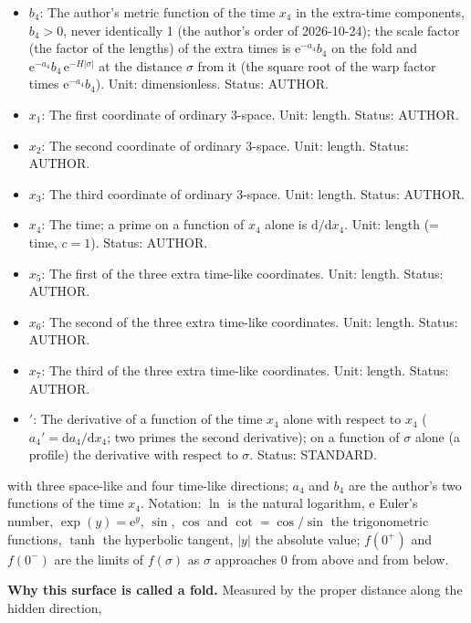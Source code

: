 \documentclass[
  10pt,
]{article}
\begin{document}
\begin{itemize}
  Status: AUTHOR.
\item
  \(b_4\): The author's metric function of the time \(x_4\) in the
  extra-time components, \(b_4 > 0\), never identically 1 (the author's
  order of 2026-10-24); the scale factor (the factor of the lengths) of
  the extra times is \(\mathrm{e}^{-a_4}b_4\) on the fold and
  \(\mathrm{e}^{-a_4}b_4\,\mathrm{e}^{-H\lvert\sigma\rvert}\) at the
  distance \(\sigma\) from it (the square root of the warp factor times
  \(\mathrm{e}^{-a_4}b_4\)). Unit: dimensionless. Status: AUTHOR.
\item
  \(x_1\): The first coordinate of ordinary 3-space. Unit: length.
  Status: AUTHOR.
\item
  \(x_2\): The second coordinate of ordinary 3-space. Unit: length.
  Status: AUTHOR.
\item
  \(x_3\): The third coordinate of ordinary 3-space. Unit: length.
  Status: AUTHOR.
\item
  \(x_4\): The time; a prime on a function of \(x_4\) alone is
  \(\mathrm{d}/\mathrm{d}x_4\). Unit: length (= time, \(c = 1\)).
  Status: AUTHOR.
\item
  \(x_5\): The first of the three extra time-like coordinates. Unit:
  length. Status: AUTHOR.
\item
  \(x_6\): The second of the three extra time-like coordinates. Unit:
  length. Status: AUTHOR.
\item
  \(x_7\): The third of the three extra time-like coordinates. Unit:
  length. Status: AUTHOR.
\item
  \({}'\): The derivative of a function of the time \(x_4\) alone with
  respect to \(x_4\) (\(a_4' = \mathrm{d}a_4/\mathrm{d}x_4\); two primes
  the second derivative); on a function of \(\sigma\) alone (a profile)
  the derivative with respect to \(\sigma\). Status: STANDARD.
\end{itemize}

with three space-like and four time-like directions; \(a_4\) and \(b_4\)
are the author's two functions of the time \(x_4\). Notation: \(\ln\) is
the natural logarithm, \(\mathrm{e}\) Euler's number,
\(\exp(y) = \mathrm{e}^y\), \(\sin\), \(\cos\) and \(\cot = \cos/\sin\)
the trigonometric functions, \(\tanh\) the hyperbolic tangent,
\(\lvert y\rvert\) the absolute value; \(f(0^+)\) and \(f(0^-)\) are the
limits of \(f(\sigma)\) as \(\sigma\) approaches 0 from above and from
below.

\textbf{Why this surface is called a fold.} Measured by the proper
distance along the hidden direction,
\end{document}

